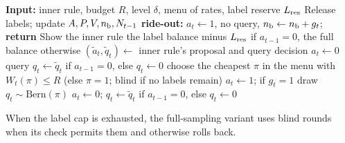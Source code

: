\documentclass[10pt]{article}
\theoremstyle{plain}
\theoremstyle{definition}
\begin{document}


\begin{algorithm}[t]
\caption{One round of the risk-budget shield; paced settlement uses the accounting construction in Appendix~\ref{app:v2}.}\label{alg:shield}
\begin{algorithmic}
\STATE \textbf{Input:} inner rule, budget $R$, level $\delta$, menu of rates, label reserve $L_{\rm res}$
\STATE Release labels; update $A,P,V,n_{\rm b},N_{t-1}$
  \STATE \textbf{ride-out:} $a_t\leftarrow1$, no query, $n_{\rm b}\leftarrow n_{\rm b}+g_t$; \textbf{return} 
\ENDIF
\STATE Show the inner rule the label balance minus $L_{\rm res}$ if $a_{t-1}=0$, the full balance otherwise
\STATE $(\tilde a_t,\tilde q_t)\leftarrow$ inner rule's proposal and query decision
  \STATE $a_t\leftarrow0$ 
  \STATE query $q_t\leftarrow\tilde q_t$ if $a_{t-1}=0$, else $q_t\leftarrow0$ 
\ELSE
  \STATE choose the cheapest $\pi$ in the menu with $W_t(\pi)\le R$ (else $\pi=1$; blind if no labels remain)
   \STATE $a_t\leftarrow1$; if $g_t=1$ draw $q_t\sim\mathrm{Bern}(\pi)$ 
  \ELSE \STATE $a_t\leftarrow0$; $q_t\leftarrow\tilde q_t$ if $a_{t-1}=0$, else $q_t\leftarrow0$ 
  \ENDIF
\ENDIF
\end{algorithmic}
\end{algorithm}

When the label cap is exhausted, the full-sampling variant uses blind rounds when its check permits them and otherwise rolls back.

\FloatBarrier
\end{document}
